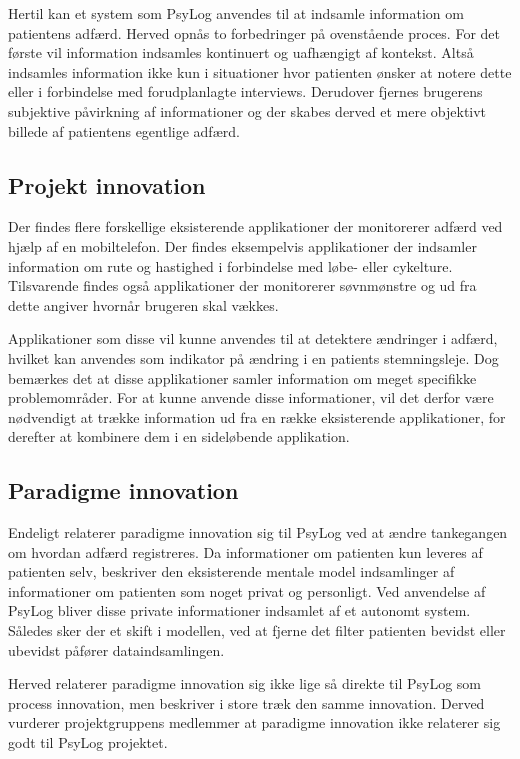 Hertil kan et system som PsyLog anvendes til at indsamle information om patientens adfærd.
Herved opnås to forbedringer på ovenstående proces.
For det første vil information indsamles kontinuert og uafhængigt af kontekst.
Altså indsamles information ikke kun i situationer hvor patienten ønsker at notere dette eller i forbindelse med forudplanlagte interviews.
Derudover fjernes brugerens subjektive påvirkning af informationer og der skabes derved et mere objektivt billede af patientens egentlige adfærd.

\subsection{Projekt innovation}
Der findes flere forskellige eksisterende applikationer der monitorerer adfærd ved hjælp af en mobiltelefon.
Der findes eksempelvis applikationer der indsamler information om rute og hastighed i forbindelse med løbe- eller cykelture.
Tilsvarende findes også applikationer der monitorerer søvnmønstre og ud fra dette angiver hvornår brugeren skal vækkes.

Applikationer som disse vil kunne anvendes til at detektere ændringer i adfærd, hvilket kan anvendes som indikator på ændring i en patients stemningsleje.
Dog bemærkes det at disse applikationer samler information om meget specifikke problemområder.
For at kunne anvende disse informationer, vil det derfor være nødvendigt at trække information ud fra en række eksisterende applikationer, for derefter at kombinere dem i en sideløbende applikation.

\subsection{Paradigme innovation}
Endeligt relaterer paradigme innovation sig til PsyLog ved at ændre tankegangen om hvordan adfærd registreres.
Da informationer om patienten kun leveres af patienten selv, beskriver den eksisterende mentale model indsamlinger af informationer om patienten som noget privat og personligt.
Ved anvendelse af PsyLog bliver disse private informationer indsamlet af et autonomt system.
Således sker der et skift i modellen, ved at fjerne det filter patienten bevidst eller ubevidst påfører dataindsamlingen.

Herved relaterer paradigme innovation sig ikke lige så direkte til PsyLog som process innovation, men beskriver i store træk den samme innovation.
Derved vurderer projektgruppens medlemmer at paradigme innovation ikke relaterer sig godt til PsyLog projektet.
